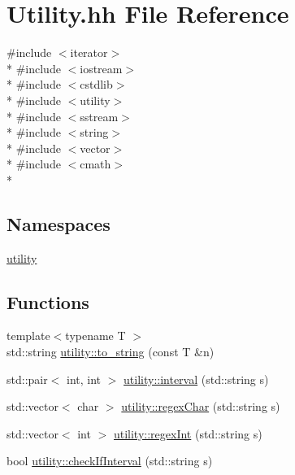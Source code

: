 \hypertarget{Utility_8hh}{\section{Utility.\-hh File Reference}
\label{Utility_8hh}
}
{\ttfamily \#include $<$iterator$>$}\\*
{\ttfamily \#include $<$iostream$>$}\\*
{\ttfamily \#include $<$cstdlib$>$}\\*
{\ttfamily \#include $<$utility$>$}\\*
{\ttfamily \#include $<$sstream$>$}\\*
{\ttfamily \#include $<$string$>$}\\*
{\ttfamily \#include $<$vector$>$}\\*
{\ttfamily \#include $<$cmath$>$}\\*
\subsection*{Namespaces}
\begin{DoxyCompactItemize}
\item 
\hyperlink{namespaceutility}{utility}
\end{DoxyCompactItemize}
\subsection*{Functions}
\begin{DoxyCompactItemize}
\item 
{\footnotesize template$<$typename T $>$ }\\std\-::string \hyperlink{namespaceutility_a73ed4d02053486d2503f7e97e5914f50}{utility\-::to\-\_\-string} (const T \&n)
\item 
std\-::pair$<$ int, int $>$ \hyperlink{namespaceutility_a7e03efd7d7194aaafccad8a2b5ff2d5b}{utility\-::interval} (std\-::string s)
\item 
std\-::vector$<$ char $>$ \hyperlink{namespaceutility_a16b3d636474a10b8231ad786337bd36c}{utility\-::regex\-Char} (std\-::string s)
\item 
std\-::vector$<$ int $>$ \hyperlink{namespaceutility_a201a20c977973f497871107c651cce5e}{utility\-::regex\-Int} (std\-::string s)
\item 
bool \hyperlink{namespaceutility_ade004409d962567243f70199ccbb0110}{utility\-::check\-If\-Interval} (std\-::string s)
\end{DoxyCompactItemize}
